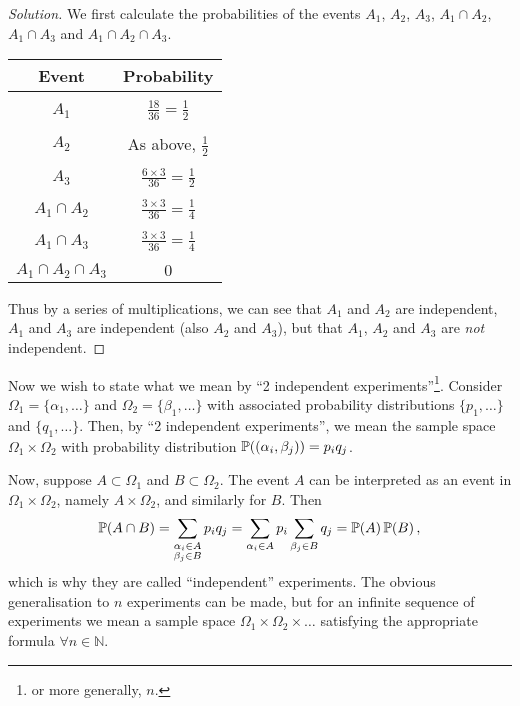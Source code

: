 \documentclass{notes}
\theoremstyle{plain}
\newcommand{\bP}{\mathbb{P}}
\newcommand{\bN}{\mathbb{N}}
\newcommand{\prob}[1]{\bP \negthinspace\left(#1\right)}
\begin{document}
\begin{proof}[Solution]
We first calculate the probabilities of the events $A_1$, $A_2$, $A_3$,
$A_1 \cap A_2$, $A_1 \cap A_3$ and $A_1 \cap A_2 \cap A_3$.
\begin{center}
\begin{tabular}{c | c }
Event & Probability\\ \hline \\
$A_1$ & $\tfrac{18}{36} = \tfrac{1}{2}$ \\ \\
$A_2$ & As above, $\tfrac{1}{2}$ \\ \\
$A_3$ & $\tfrac{6 \times 3}{36} = \tfrac{1}{2}$ \\ \\
$A_1 \cap A_2$ & $\tfrac{3 \times 3}{36} = \tfrac{1}{4}$ \\ \\
$A_1 \cap A_3$ & $\tfrac{3 \times 3}{36} = \tfrac{1}{4}$ \\ \\
$A_1 \cap A_2 \cap A_3$ & $0$
\end{tabular}
\end{center}

Thus by a series of multiplications, we can see that $A_1$ and $A_2$ are
independent, $A_1$ and $A_3$ are independent (also $A_2$ and $A_3$),
but that $A_1$, $A_2$ and $A_3$ are \emph{not} independent.
\end{proof}

Now we wish to state what we mean by ``2 independent experiments''\footnote{or
more generally, $n$.}.  Consider $\Omega_1 = \{ \alpha_1, \dots \}$ and
$\Omega_2 = \{ \beta_1, \dots \}$ with associated probability distributions
$\{ p_1, \dots \}$ and $\{ q_1, \dots \}$.  Then, by ``2 independent
experiments'', we mean the sample space $\Omega_1 \times \Omega_2$ with
probability distribution $\prob{ (\alpha_i, \beta_j) } = p_i q_j$.

Now, suppose $A \subset \Omega_1$ and $B \subset \Omega_2$.  The event $A$
can be interpreted as an event in $\Omega_1 \times \Omega_2$, namely
$A \times \Omega_2$, and similarly for $B$.  Then
\[
\prob{A \cap B} = \sum_{\substack{\alpha_i \in A \\ \beta_j \in B}}
p_i q_j = \sum_{\alpha_i \in A} p_i \sum_{\beta_j \in B} q_j =
\prob{A} \prob{B},
\]
which is why they are called ``independent'' experiments.  The obvious
generalisation to $n$ experiments can be made, but for an infinite sequence
of experiments we mean a sample space $\Omega_1 \times \Omega_2 \times \dots$
satisfying the appropriate formula $\forall n \in \bN$.
\end{document}
